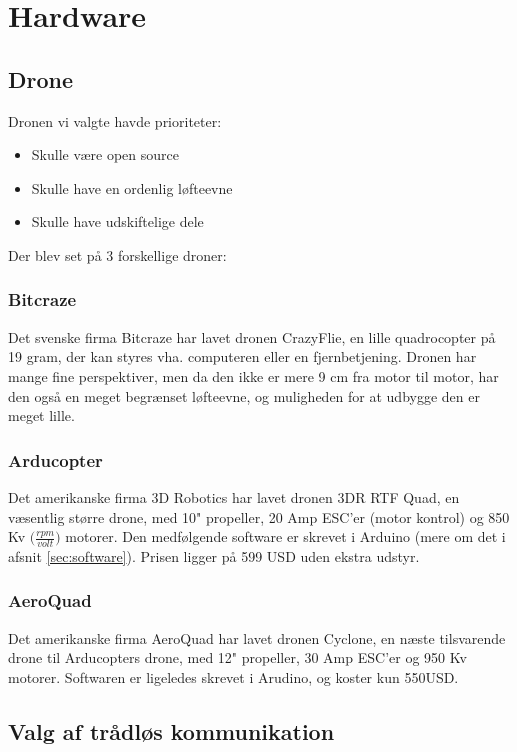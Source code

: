 \documentclass[Main]{subfiles}
\begin{document}
\chapter{Hardware}


\section{Drone}
Dronen vi valgte havde prioriteter:
\begin{itemize}
\item Skulle være open source
\item Skulle have en ordenlig løfteevne
\item Skulle have udskiftelige dele
\end{itemize}

Der blev set på 3 forskellige droner:
\subsection{Bitcraze}
Det svenske firma Bitcraze har lavet dronen CrazyFlie\cite{BitCraze}, en lille quadrocopter på 19 gram, der kan styres vha. computeren eller en fjernbetjening.
Dronen har mange fine perspektiver, men da den ikke er mere 9 cm fra motor til motor, har den også en meget begrænset løfteevne, og muligheden for at udbygge den er meget lille.

\subsection{Arducopter}
Det amerikanske firma 3D Robotics har lavet dronen 3DR RTF Quad\cite{ArduCopter}, en væsentlig større drone, med 10" propeller, 20 Amp ESC'er (motor kontrol) og 850 Kv $\big( \frac{rpm}{volt}\big)$ motorer.
Den medfølgende software er skrevet i Arduino (mere om det i afsnit \ref{sec:software}). 
Prisen ligger på 599 USD uden ekstra udstyr.

\subsection{AeroQuad}
Det amerikanske firma AeroQuad har lavet dronen Cyclone\cite{AQ-store}, en næste tilsvarende drone til Arducopters drone, med 12" propeller, 30 Amp ESC'er og 950 Kv motorer.
Softwaren er ligeledes skrevet i Arudino, og koster kun 550USD.


\section{Valg af trådløs kommunikation}
\end{document}
